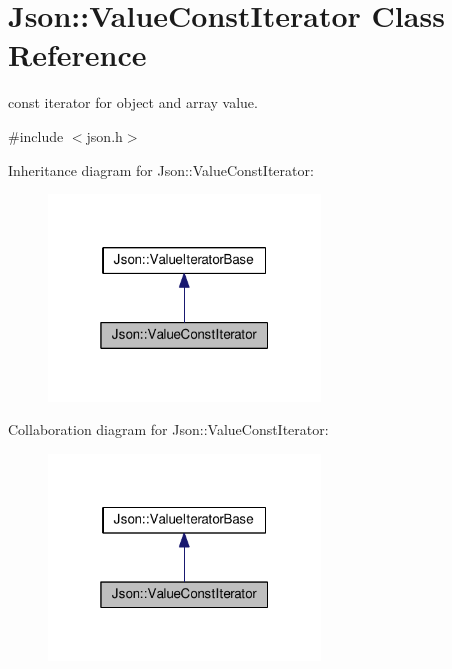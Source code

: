 \hypertarget{class_json_1_1_value_const_iterator}{}\section{Json\+:\+:Value\+Const\+Iterator Class Reference}
\label{class_json_1_1_value_const_iterator}


const iterator for object and array value.  




{\ttfamily \#include $<$json.\+h$>$}



Inheritance diagram for Json\+:\+:Value\+Const\+Iterator\+:
\nopagebreak
\begin{figure}[H]
\begin{center}
\leavevmode
\includegraphics[width=205pt]{class_json_1_1_value_const_iterator__inherit__graph}
\end{center}
\end{figure}


Collaboration diagram for Json\+:\+:Value\+Const\+Iterator\+:
\nopagebreak
\begin{figure}[H]
\begin{center}
\leavevmode
\includegraphics[width=205pt]{class_json_1_1_value_const_iterator__coll__graph}
\end{center}
\end{figure}
